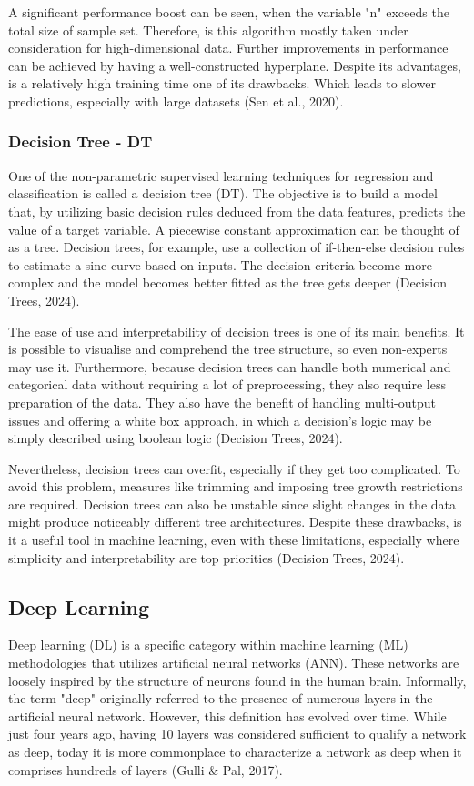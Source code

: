 A significant performance boost can be seen, when the variable "n" exceeds the total size of sample set. Therefore, is this algorithm mostly taken under consideration for high-dimensional data. Further improvements in performance can be achieved by having a well-constructed hyperplane. Despite its advantages, is a relatively high training time one of its drawbacks. Which leads to slower predictions, especially with large datasets (Sen et al., 2020).

\subsubsection{Decision Tree - DT}

One of the non-parametric supervised learning techniques for regression and classification is called a decision tree (DT). The objective is to build a model that, by utilizing basic decision rules deduced from the data features, predicts the value of a target variable. A piecewise constant approximation can be thought of as a tree. Decision trees, for example, use a collection of if-then-else decision rules to estimate a sine curve based on inputs. The decision criteria become more complex and the model becomes better fitted as the tree gets deeper (Decision Trees, 2024).

The ease of use and interpretability of decision trees is one of its main benefits. It is possible to visualise and comprehend the tree structure, so even non-experts may use it. Furthermore, because decision trees can handle both numerical and categorical data without requiring a lot of preprocessing, they also require less preparation of the data. They also have the benefit of handling multi-output issues and offering a white box approach, in which a decision's logic may be simply described using boolean logic (Decision Trees, 2024).

Nevertheless, decision trees can overfit, especially if they get too complicated. To avoid this problem, measures like trimming and imposing tree growth restrictions are required. Decision trees can also be unstable since slight changes in the data might produce noticeably different tree architectures. Despite these drawbacks, is it a useful tool in machine learning, even with these limitations, especially where simplicity and interpretability are top priorities (Decision Trees, 2024).


\subsection{Deep Learning}
Deep learning (DL) is a specific category within machine learning (ML) methodologies that utilizes artificial neural networks (ANN). These networks are loosely inspired by the structure of neurons found in the human brain. Informally, the term "deep" originally referred to the presence of numerous layers in the artificial neural network. However, this definition has evolved over time. While just four years ago, having 10 layers was considered sufficient to qualify a network as deep, today it is more commonplace to characterize a network as deep when it comprises hundreds of layers (Gulli \& Pal, 2017). 

